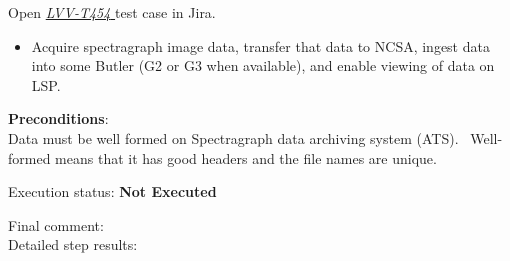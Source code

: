 \documentclass[DM,lsstdraft,STR,toc]{lsstdoc}
\providecommand{\tightlist}{
  \setlength{\itemsep}{0pt}\setlength{\parskip}{0pt}}
\begin{document}
Open  \href{https://jira.lsstcorp.org/secure/Tests.jspa#/testCase/LVV-T454}{\textit{ LVV-T454 } }
test case in Jira.

    \begin{itemize}
\tightlist
\item
  Acquire spectragraph image data, transfer that data to NCSA, ingest
  data into some Butler (G2 or G3 when available), and enable viewing of
  data on LSP. ~
\end{itemize}


    {\bf Preconditions}:\\
    Data must be well formed on Spectragraph data archiving system (ATS).
~Well-formed means that it has good headers and the file names are
unique. ~


    Execution status: {\bf Not Executed }

    Final comment:\\


    Detailed step results:
\end{document}
